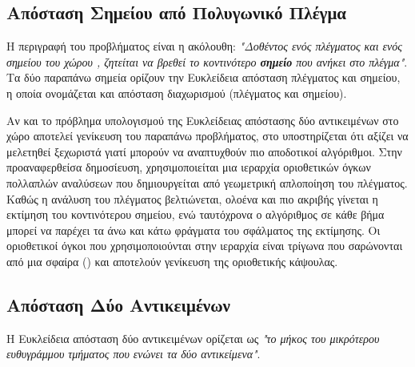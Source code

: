 
\subsection{Απόσταση Σημείου από Πολυγωνικό Πλέγμα}
Η περιγραφή του προβλήματος είναι η ακόλουθη: 
\textit{"Δοθέντος ενός πλέγματος και ενός σημείου του χώρου ,
ζητείται να βρεθεί το κοντινότερο \textbf{σημείο} που ανήκει 
στο πλέγμα"}.
Τα δύο παραπάνω σημεία ορίζουν την Ευκλείδεια απόσταση πλέγματος και σημείου, 
η οποία ονομάζεται και απόσταση διαχωρισμού (πλέγματος και σημείου).

Αν και το πρόβλημα υπολογισμού της Ευκλείδειας απόστασης δύο αντικειμένων 
στο χώρο αποτελεί γενίκευση του παραπάνω προβλήματος, στο 
\cite{guezlec2001meshsweeper} υποστηρίζεται ότι αξίζει να μελετηθεί 
ξεχωριστά γιατί μπορούν να αναπτυχθούν πιο αποδοτικοί αλγόριθμοι.
Στην προαναφερθείσα δημοσίευση, χρησιμοποιείται μια ιεραρχία οριοθετικών 
όγκων πολλαπλών αναλύσεων που δημιουργείται από γεωμετρική απλοποίηση 
του πλέγματος. 
Καθώς η ανάλυση του πλέγματος βελτιώνεται, ολοένα και πιο ακριβής γίνεται 
η εκτίμηση του κοντινότερου σημείου, ενώ ταυτόχρονα ο αλγόριθμος σε κάθε βήμα 
μπορεί να παρέχει τα άνω και κάτω φράγματα του σφάλματος της εκτίμησης.
Οι οριοθετικοί όγκοι που χρησιμοποιούνται στην ιεραρχία είναι τρίγωνα 
που σαρώνονται από μια σφαίρα () και 
αποτελούν γενίκευση της οριοθετικής κάψουλας. 
  
\subsection{Απόσταση Δύο Αντικειμένων}
Η Ευκλείδεια απόσταση δύο αντικειμένων ορίζεται ως \textit{"το μήκος του 
μικρότερου ευθυγράμμου τμήματος που ενώνει τα δύο αντικείμενα"}. 

